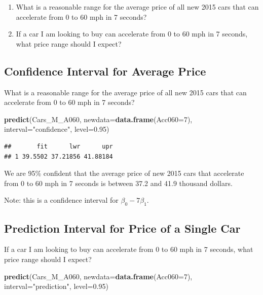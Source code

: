 \documentclass[]{book}
\newenvironment{Shaded}{\begin{snugshade}}{\end{snugshade}}
\newcommand{\KeywordTok}[1]{\textcolor[rgb]{0.13,0.29,0.53}{\textbf{#1}}}
\newcommand{\DataTypeTok}[1]{\textcolor[rgb]{0.13,0.29,0.53}{#1}}
\newcommand{\DecValTok}[1]{\textcolor[rgb]{0.00,0.00,0.81}{#1}}
\newcommand{\FloatTok}[1]{\textcolor[rgb]{0.00,0.00,0.81}{#1}}
\newcommand{\StringTok}[1]{\textcolor[rgb]{0.31,0.60,0.02}{#1}}
\newcommand{\NormalTok}[1]{#1}
\begin{document}
\begin{enumerate}
\def\labelenumi{\arabic{enumi}.}
\item
  What is a reasonable range for the average price of all new 2015 cars
  that can accelerate from 0 to 60 mph in 7 seconds?
\item
  If a car I am looking to buy can accelerate from 0 to 60 mph in 7
  seconds, what price range should I expect?
\end{enumerate}

\subsection{Confidence Interval for Average
Price}\label{confidence-interval-for-average-price}

What is a reasonable range for the average price of all new 2015 cars
that can accelerate from 0 to 60 mph in 7 seconds?

\begin{Shaded}
\begin{Highlighting}[]
\KeywordTok{predict}\NormalTok{(Cars_M_A060, }\DataTypeTok{newdata=}\KeywordTok{data.frame}\NormalTok{(}\DataTypeTok{Acc060=}\DecValTok{7}\NormalTok{), }\DataTypeTok{interval=}\StringTok{"confidence"}\NormalTok{, }\DataTypeTok{level=}\FloatTok{0.95}\NormalTok{)}
\end{Highlighting}
\end{Shaded}

\begin{verbatim}
##       fit      lwr      upr
## 1 39.5502 37.21856 41.88184
\end{verbatim}

We are 95\% confident that the average price of new 2015 cars that
accelerate from 0 to 60 mph in 7 seconds is between 37.2 and 41.9
thousand dollars.

Note: this is a confidence interval for \(\beta_0 -7\beta_1\).

\subsection{Prediction Interval for Price of a Single
Car}\label{prediction-interval-for-price-of-a-single-car}

If a car I am looking to buy can accelerate from 0 to 60 mph in 7
seconds, what price range should I expect?

\begin{Shaded}
\begin{Highlighting}[]
\KeywordTok{predict}\NormalTok{(Cars_M_A060, }\DataTypeTok{newdata=}\KeywordTok{data.frame}\NormalTok{(}\DataTypeTok{Acc060=}\DecValTok{7}\NormalTok{), }\DataTypeTok{interval=}\StringTok{"prediction"}\NormalTok{, }\DataTypeTok{level=}\FloatTok{0.95}\NormalTok{)}
\end{Highlighting}
\end{Shaded}
\end{document}
